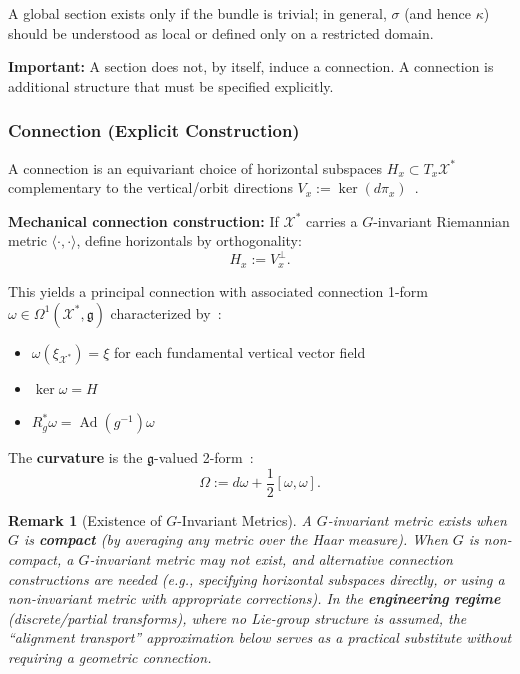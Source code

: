 \documentclass[12pt]{article}
\newtheorem{remark}[theorem]{Remark}
\begin{document}
A global section exists only if the bundle is trivial; in general, $\sigma$ (and hence $\kappa$) should be understood
as local or defined only on a restricted domain.

\textbf{Important:} A section does not, by itself, induce a connection. A connection is additional
structure that must be specified explicitly.

\subsubsection{Connection (Explicit Construction)}

A connection is an equivariant choice of horizontal subspaces $H_x \subset T_x \mathcal{X}^*$ complementary to the
vertical/orbit directions $V_x := \ker(d\pi_x)$~\cite{kobayashi1963,frankel2011}.

\textbf{Mechanical connection construction:} If $\mathcal{X}^*$ carries a $G$-invariant Riemannian metric $\langle \cdot, \cdot \rangle$,
define horizontals by orthogonality:
\[
H_x := V_x^\perp.
\]

This yields a principal connection with associated connection 1-form $\omega \in \Omega^1(\mathcal{X}^*, \mathfrak{g})$ characterized
by~\cite{bleecker1981}:
\begin{itemize}
\item $\omega(\xi_{\mathcal{X}^*}) = \xi$ for each fundamental vertical vector field
\item $\ker \omega = H$
\item $R_g^* \omega = \operatorname{Ad}(g^{-1})\omega$
\end{itemize}

The \textbf{curvature} is the $\mathfrak{g}$-valued 2-form~\cite{nakahara2003}:
\[
\Omega := d\omega + \frac{1}{2}[\omega, \omega].
\]

\begin{remark}[Existence of $G$-Invariant Metrics]
\emph{A $G$-invariant metric exists when $G$ is \textbf{compact} (by
averaging any metric over the Haar measure). When $G$ is non-compact, a $G$-invariant metric may
not exist, and alternative connection constructions are needed (e.g., specifying horizontal subspaces
directly, or using a non-invariant metric with appropriate corrections). In the \textbf{engineering regime}
(discrete/partial transforms), where no Lie-group structure is assumed, the ``alignment transport''
approximation below serves as a practical substitute without requiring a geometric connection.}
\end{remark}
\end{document}
